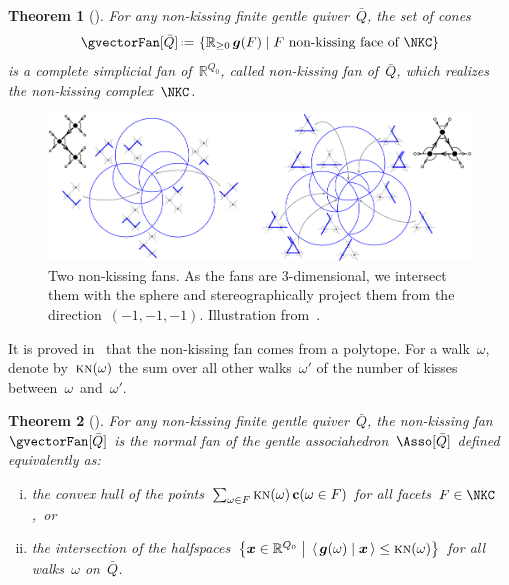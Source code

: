 \documentclass{amsart}
\newtheorem{theorem}{Theorem}[section]
\theoremstyle{definition}
\newcommand{\R}{\mathbb{R}} %
\renewcommand{\b}[1]{{\boldsymbol{#1}}} %
\newcommand{\set}[2]{\left\{ #1 \;\middle|\; #2 \right\}} %
\newcommand{\bigset}[2]{\big\{ #1 \;\big|\; #2 \big\}} %
\newcommand{\dotprod}[2]{\left\langle \, #1 \; \middle| \; #2 \, \right\rangle} %
\newcommand{\eqdef}{\mbox{\,\raisebox{0.2ex}{\scriptsize\ensuremath{\mathrm:}}\ensuremath{=}\,}} %
\newcommand{\darkblue}{\color{darkblue}} %
\newcommand{\defn}[1]{\textsl{\darkblue #1}} %
\newcommand{\gvector}[1]{\b{g}(#1)} %
\newcommand{\gvectors}[1]{\b{g}(#1)} %
\newcommand{\cvector}[2]{\mathbf{c}(#2 \in #1)} %
\newcommand{\quiver}{\bar Q} %
\newcommand{\KN}{\textsc{kn}} %
\begin{document}
\begin{theorem}[{\cite[Thm.~4.17]{PaluPilaudPlamondon-nonkissing}}]
\label{thm:nonkissingFan}
For any non-kissing finite gentle quiver~$\quiver$, the set of cones
\[
\gvectorFan[\quiver] \eqdef \set{\R_{\ge 0} \, \gvectors{F}}{F \text{ non-kissing face of } \NKC}
\]
is a complete simplicial fan of~$\R^{Q_0}$, called \defn{non-kissing fan} of~$\quiver$, which realizes the non-kissing complex~$\NKC$.
\end{theorem}

\begin{figure}[h]
	\capstart
	\centerline{\includegraphics[scale=.45]{nonkissingFans}}
	\caption{Two non-kissing fans. As the fans are $3$-dimensional, we intersect them with the sphere and stereographically project them from the direction~$(-1,-1,-1)$. Illustration from~\cite{PaluPilaudPlamondon-nonkissing}.}
	\label{fig:nonkissingFans}
\end{figure}

\enlargethispage{.1cm}
It is proved in~\cite[Thm.~4.27]{PaluPilaudPlamondon-nonkissing} that the non-kissing fan comes from a polytope.
For a walk~$\omega$, denote by~$\KN(\omega)$ the sum over all other walks~$\omega'$ of the number of kisses between~$\omega$~and~$\omega'$.

\begin{theorem}[{\cite[Thm.~4.27]{PaluPilaudPlamondon-nonkissing}}]
\label{thm:nonkissingAsso}
For any non-kissing finite gentle quiver~$\quiver$, the non-kissing fan~$\gvectorFan[\quiver]$ is the normal fan of the \defn{gentle associahedron}~$\Asso[\quiver]$ defined equivalently as:
\begin{enumerate}[(i)]
\item the convex hull of the points~$\sum_{\omega \in F} \KN(\omega) \, \cvector{F}{\omega}$ for all facets~${F \in \NKC}$,~or
\item the intersection of the halfspaces~$\bigset{\b{x} \in \R^{Q_0}}{\dotprod{\gvector{\omega}}{\b{x}} \le \KN(\omega)}$ for all walks~$\omega$ on~$\bar Q$.
\end{enumerate}
\end{theorem}
\end{document}
